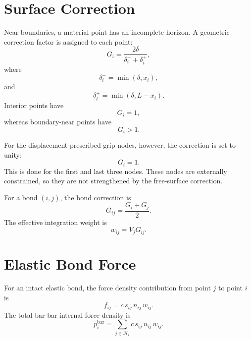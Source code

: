 \documentclass[11pt]{article}
\begin{document}
\section{Surface Correction}

Near boundaries, a material point has an incomplete horizon. A geometric correction factor is assigned to each point:
\begin{equation}
G_i
=
\frac{2\delta}{\delta_i^-+\delta_i^+},
\end{equation}
where
\begin{equation}
\delta_i^- = \min(\delta,x_i),
\end{equation}
and
\begin{equation}
\delta_i^+ = \min(\delta,L-x_i).
\end{equation}
Interior points have
\begin{equation}
G_i = 1,
\end{equation}
whereas boundary-near points have
\begin{equation}
G_i > 1.
\end{equation}

For the displacement-prescribed grip nodes, however, the correction is set to unity:
\begin{equation}
G_i = 1.
\end{equation}
This is done for the first and last three nodes. These nodes are externally constrained, so they are not strengthened by the free-surface correction.

For a bond \((i,j)\), the bond correction is
\begin{equation}
G_{ij}
=
\frac{G_i+G_j}{2}.
\end{equation}
The effective integration weight is
\begin{equation}
w_{ij}
=
V_jG_{ij}.
\end{equation}

\section{Elastic Bond Force}

For an intact elastic bond, the force density contribution from point \(j\) to point \(i\) is
\begin{equation}
f_{ij}
=
c\,s_{ij}\,n_{ij}\,w_{ij}.
\end{equation}
The total bar-bar internal force density is
\begin{equation}
p_i^{\mathrm{bar}}
=
\sum_{j\in\mathcal{H}_i}
c\,s_{ij}\,n_{ij}\,w_{ij}.
\end{equation}
\end{document}

